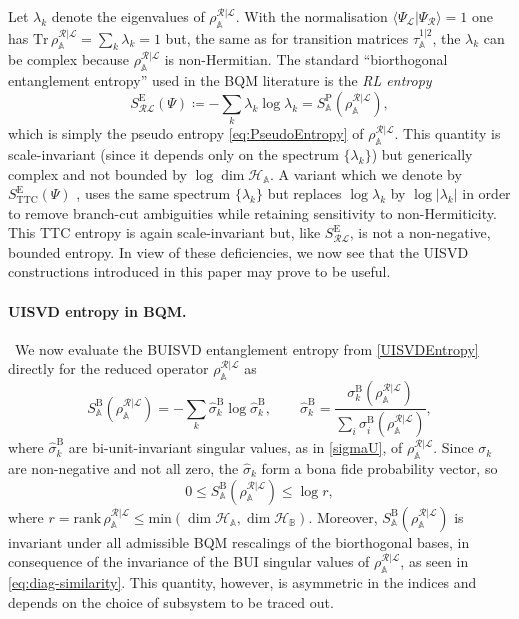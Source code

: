\documentclass[11pt,a4paper]{article}
\begin{document}
Let $\lambda_k$ denote the eigenvalues of $\rho_\mathbb{A}^{\mathcal{R|L}}$. With the normalisation $\langle\Psi_{\mathcal L}|\Psi_{\mathcal R}\rangle=1$ one has
$\mathrm{Tr}\,\rho_\mathbb{A}^{\mathcal{R|L}} = \sum_k \lambda_k = 1$ but, the same as for transition matrices $\tau^{1|2}_\mathbb{A}$, the $\lambda_k$ can be complex because $\rho_\mathbb{A}^{\mathrm{\mathcal{R|L}}}$ is non-Hermitian. The standard ``biorthogonal entanglement entropy'' used in the BQM literature is the \textit{RL entropy} \cite{Chang:2019nhn,Yang:2024hzt,Herviou:2019yfb} 
\begin{equation}
S^\mathrm{E}_{\mathcal{RL}}(\Psi)
\coloneq - \sum_k \lambda_k \log\lambda_k=S^\mathrm{P}_\mathbb{A}(\rho_\mathbb{A}^{\mathcal{R|L}}),
\end{equation}
which is simply the pseudo entropy \cref{eq:PseudoEntropy} of $\rho_\mathbb{A}^{\mathcal{R|L}}$. This quantity is scale-invariant (since it depends only on the spectrum $\{\lambda_k\}$) but generically complex and not bounded by $\log\dim\mathcal H_\mathbb{A}$. A variant which we denote by $S^\mathrm{E}_{\mathrm{TTC}}(\Psi)$ \cite{Tu:2021tf,Yang:2024ebm}, uses the same spectrum $\{\lambda_k\}$ but replaces $\log\lambda_k$ by $\log|\lambda_k|$ in order to remove branch-cut ambiguities while retaining sensitivity to non-Hermiticity. This TTC entropy is again scale-invariant but, like $S^\mathrm{E}_{\mathcal{RL}}$, is not a non-negative, bounded entropy. In view of these deficiencies, we now see that the UISVD constructions introduced in this paper may prove to be useful.
\paragraph{UISVD entropy in BQM.}\,
We now evaluate the BUISVD entanglement entropy from \cref{UISVDEntropy} directly for the reduced operator $\rho_\mathbb{A}^{\mathcal{R|L}}$ as
\begin{equation}\label{eq:bqm-uisvd-entropy}
S^{\mathrm B}_\mathbb{A}(\rho_\mathbb{A}^{\mathcal{R|L}})
= -\sum_k \hat{\sigma}^\mathrm{B}_k \log \hat{\sigma}^\mathrm{B}_k, \qquad \hat{\sigma}^\mathrm{B}_k = \frac{\sigma^\mathrm{B}_k(\rho_\mathbb{A}^{\mathcal{R|L}})}{\sum_i \sigma^\mathrm{B}_i(\rho_\mathbb{A}^{\mathcal{R|L}})}, 
\end{equation}
where $\hat{\sigma}^\mathrm{B}_k$ are bi-unit-invariant singular values, as in \cref{sigmaU}, of $\rho_\mathbb{A}^{\mathcal{R|L}}$. Since $\sigma_k$ are non-negative and not all zero, the $\hat{\sigma}_k$ form a bona fide probability vector, so
\begin{equation}
0 \le S^{\mathrm B}_\mathbb{A}(\rho_\mathbb{A}^{\mathcal{R|L}})
\le \log r,
\end{equation}
where $r=\mathrm{rank}\,\rho_\mathbb{A}^{\mathcal{R|L}}
\le \text{min}(\dim\mathcal H_\mathbb{A},\dim\mathcal H_\mathbb{B})$. 
Moreover, $S^{\mathrm B}_\mathbb{A}(\rho_\mathbb{A}^{\mathcal{R|L}})$ is invariant under all admissible BQM rescalings of the biorthogonal bases, in consequence of the invariance of the BUI singular values of $\rho_\mathbb{A}^{\mathcal{R|L}}$, as seen in \cref{eq:diag-similarity}. This quantity, however, is asymmetric in the indices and depends on the choice of subsystem to be traced out. 
\end{document}
